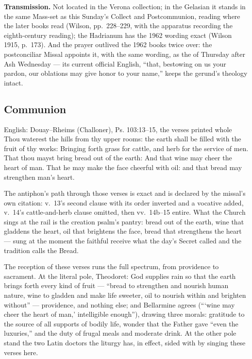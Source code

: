 \textbf{Transmission.} Not located in the Verona
collection; in the Gelasian it stands in the same Mass-set as this Sunday's
Collect and Postcommunion, reading  where the later books
read  (Wilson, pp.~228--229, with the apparatus recording
the eighth-century reading); the Hadrianum has the 1962 wording exact
(Wilson 1915, p.~173). And the prayer outlived the 1962 books twice over:
the postconciliar Missal appoints it, with the same wording, as the
 of Thursday after Ash Wednesday --- its current
official English, ``that, bestowing on us your pardon, our oblations may
give honor to your name,'' keeps the gerund's theology intact.

\elementguard
\subsection*{Communion }


\begin{namedtranslation}{English: Douay--Rheims (Challoner), Ps. 103:13--15, the verses printed whole}
Thou waterest the hills from thy upper rooms: the earth shall be filled with
the fruit of thy works: Bringing forth grass for cattle, and herb for the
service of men. That thou mayst bring bread out of the earth: And that wine
may cheer the heart of man. That he may make the face cheerful with oil: and
that bread may strengthen man's heart.
\end{namedtranslation}

The antiphon's path through those verses is exact and is declared by the
missal's own citation: v.~13's second clause with its order inverted and a
vocative added, v.~14's cattle-and-herb clause omitted, then vv.~14b--15
entire. What the Church sings at the rail is the creation psalm's pantry:
bread out of the earth, wine that gladdens the heart, oil that brightens the
face, bread that strengthens the heart --- sung at the moment the faithful
receive what the day's Secret called  and the tradition calls
the Bread.

The reception of these verses runs the full spectrum, from providence to
sacrament. At the literal pole, Theodoret: God supplies rain so that
the earth brings forth every kind of fruit --- ``bread to strengthen and
nourish human nature, wine to gladden and make life sweeter, oil to nourish
within and brighten without'' --- providence, and nothing else; and
Bellarmine agrees (``\thinspace`wine may cheer the heart of man,'
intelligible enough''), drawing three morals: gratitude to the source of all
supports of bodily life, wonder that the Father gave ``even the luxuries,''
and the duty of frugal meals and moderate drink. At the other pole stand the
two Latin doctors the liturgy has, in effect, sided with by singing these
verses here.

